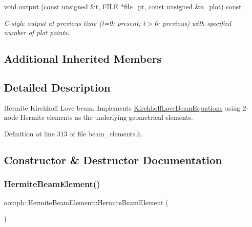 \begin{DoxyCompactItemize}
void \hyperlink{classoomph_1_1HermiteBeamElement_afc92c0d3a0b5ca4bbd4c6232e6858a8a}{output} (const unsigned \&\hyperlink{cfortran_8h_af6f0bd3dc13317f895c91323c25c2b8f}{t}, F\+I\+LE $\ast$file\+\_\+pt, const unsigned \&n\+\_\+plot) const
\begin{DoxyCompactList}\small\item\em C-\/style output at previous time (t=0\+: present; t$>$0\+: previous) with specified number of plot points. \end{DoxyCompactList}\end{DoxyCompactItemize}
\subsection*{Additional Inherited Members}


\subsection{Detailed Description}
Hermite Kirchhoff Love beam. Implements \hyperlink{classoomph_1_1KirchhoffLoveBeamEquations}{Kirchhoff\+Love\+Beam\+Equations} using 2-\/node Hermite elements as the underlying geometrical elements. 

Definition at line 313 of file beam\+\_\+elements.\+h.



\subsection{Constructor \& Destructor Documentation}
\mbox{\label{classoomph_1_1HermiteBeamElement_a6671722e3e47b8ff355794f986642811}} 
\subsubsection{\texorpdfstring{Hermite\+Beam\+Element()}{HermiteBeamElement()}}
{\footnotesize\ttfamily oomph\+::\+Hermite\+Beam\+Element\+::\+Hermite\+Beam\+Element (\begin{DoxyParamCaption}{ }\end{DoxyParamCaption})\hspace{0.3cm}{\ttfamily [inline]}}



